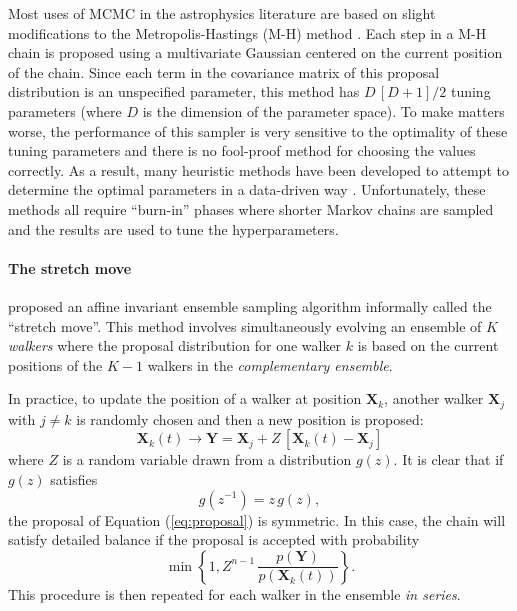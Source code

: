 \documentclass[preprint]{aastex}
\newcommand{\eqlabel}[1]{\label{eq:#1}}
\newcommand{\eq}[1]{Equation (\ref{eq:#1})}
\begin{document}
Most uses of MCMC in the astrophysics literature are based on slight modifications
to the Metropolis-Hastings (M-H) method \citep[e.g.][]{MacKay:2003}. Each step in
a M-H chain is proposed using a multivariate Gaussian centered on the current
position of the chain. Since each term in the covariance matrix of this proposal
distribution is an unspecified parameter, this method has $D\,[D+1]/2$ tuning parameters
(where $D$ is the dimension of the parameter space).  To make matters worse, the
performance of this sampler is very sensitive to the optimality of these tuning
parameters and there is no fool-proof method for choosing the values correctly.
As a result, many heuristic methods have been developed to attempt to determine
the optimal parameters in a data-driven way \citep[e.g.][]{Gregory:2005,Dunkley:2005,Widrow:2008}.
Unfortunately, these methods all require ``burn-in'' phases where shorter Markov chains
are sampled and the results are used to tune the hyperparameters.

\paragraph{The stretch move}

\citet{Goodman:2010} proposed an affine invariant ensemble sampling algorithm
informally called the ``stretch move''. This method involves simultaneously
evolving an ensemble of $K$ \emph{walkers} where the proposal distribution for one
walker $k$ is based on the current positions of the $K-1$ walkers in the
\emph{complementary ensemble}.

In practice, to update the position of a walker at position $\mathbf{X}_k$,
another walker $\mathbf{X}_j$ with $j \ne k$ is randomly chosen and then
a new position is proposed:
\begin{equation}
    \eqlabel{proposal}
    \mathbf{X}_k (t) \rightarrow \mathbf{Y} = \mathbf{X}_j + Z \, [\mathbf{X}_k (t) - \mathbf{X}_j]
\end{equation}
where $Z$ is a random variable drawn from a distribution $g(z)$.  It is clear that
if $g(z)$ satisfies
\begin{equation}
    g(z^{-1}) = z \, g(z),
\end{equation}
the proposal of \eq{proposal} is symmetric. In this case, the chain will satisfy
detailed balance if the proposal is accepted with probability
\begin{equation}
    \min \left \{ 1, Z^{n-1} \, \frac{p(\mathbf{Y})}{p(\mathbf{X}_k(t))} \right \}.
\end{equation}
This procedure is then repeated for each walker in the ensemble \emph{in series}.
\end{document}
